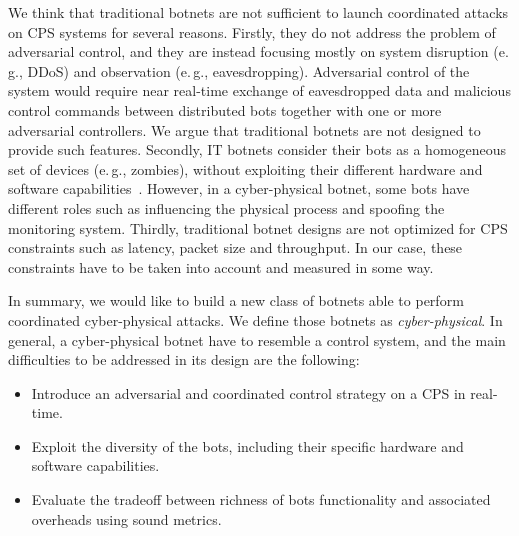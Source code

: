 \documentclass[sigconf]{acmart}
\makeatletter
\newcommand{\eg}{e.\@\,g.,\@\xspace}
\newcommand{\nils}[1]{\textcolor{red}{Nils: #1}}
\makeatother
\begin{document}
We think that traditional botnets are not sufficient to launch coordinated
attacks on CPS systems for several reasons. Firstly, they do
not address the problem of adversarial control, and they are instead
focusing mostly on system disruption (\eg DDoS) and observation (\eg
eavesdropping). Adversarial control of the system would require near
real-time exchange of eavesdropped data and malicious control commands
between distributed bots together with one or more adversarial controllers.
We argue that traditional botnets are not designed to provide such features.
Secondly, IT botnets consider their bots as a homogeneous set of devices
(\eg zombies), without exploiting their different hardware and software
capabilities~\cite{silva2013botnets}. However, in a cyber-physical botnet, some
bots have different roles such as influencing the physical process and spoofing
the monitoring system. Thirdly, traditional botnet designs are not optimized
for CPS constraints such as latency, packet size and throughput. In our case,
these constraints have to be taken into account and measured in some way.






In summary, we would like to build a new class of botnets able to
perform coordinated cyber-physical attacks. We define those botnets as
\emph{cyber-physical}. In general, a cyber-physical botnet have to resemble a
control system, and the main difficulties to be addressed in its design are
the following:

\begin{itemize}
    \item Introduce an adversarial and coordinated
        control strategy on a CPS in real-time.
    \item Exploit the diversity of the bots, including their specific hardware
        and software capabilities.
    \item Evaluate the tradeoff between richness of bots functionality and
        associated overheads using sound metrics.
\end{itemize}
\end{document}
